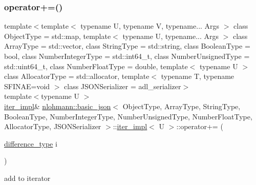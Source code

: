 \subsubsection{\texorpdfstring{operator+=()}{operator+=()}}
{\footnotesize\ttfamily template$<$template$<$ typename U, typename V, typename... Args $>$ class Object\+Type = std\+::map, template$<$ typename U, typename... Args $>$ class Array\+Type = std\+::vector, class String\+Type  = std\+::string, class Boolean\+Type  = bool, class Number\+Integer\+Type  = std\+::int64\+\_\+t, class Number\+Unsigned\+Type  = std\+::uint64\+\_\+t, class Number\+Float\+Type  = double, template$<$ typename U $>$ class Allocator\+Type = std\+::allocator, template$<$ typename T, typename S\+F\+I\+N\+A\+E=void $>$ class J\+S\+O\+N\+Serializer = adl\+\_\+serializer$>$ \\
template$<$typename U $>$ \\
\mbox{\hyperlink{classnlohmann_1_1basic__json_1_1iter__impl}{iter\+\_\+impl}}\& \mbox{\hyperlink{classnlohmann_1_1basic__json}{nlohmann\+::basic\+\_\+json}}$<$ Object\+Type, Array\+Type, String\+Type, Boolean\+Type, Number\+Integer\+Type, Number\+Unsigned\+Type, Number\+Float\+Type, Allocator\+Type, J\+S\+O\+N\+Serializer $>$\+::\mbox{\hyperlink{classnlohmann_1_1basic__json_1_1iter__impl}{iter\+\_\+impl}}$<$ U $>$\+::operator+= (\begin{DoxyParamCaption}\item[{\mbox{\hyperlink{classnlohmann_1_1basic__json_1_1iter__impl_aa3d908ee643e5938d32e5f6d261d7715}{difference\+\_\+type}}}]{i }\end{DoxyParamCaption})\hspace{0.3cm}{\ttfamily [inline]}}



add to iterator 

